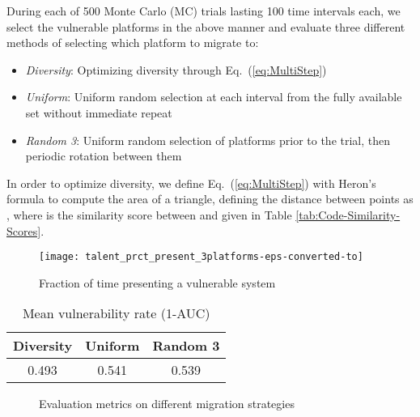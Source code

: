 \documentclass{acm_proc_article-sp}
\providecommand{\tabularnewline}{\\}
\begin{document}
During each of 500 Monte Carlo (MC) trials lasting 100 time intervals each, we select the vulnerable platforms in the above manner and evaluate three different methods of selecting which platform to migrate to:
\begin{itemize}
\item \emph{Diversity}: Optimizing diversity through Eq.\ (\ref{eq:MultiStep})
\item \emph{Uniform}: Uniform random selection at each interval from the fully available set without immediate repeat
\item \emph{Random 3}: Uniform random selection of  platforms prior to the trial, then periodic rotation between them
\end{itemize}
In order to optimize diversity, we define Eq.\ (\ref{eq:MultiStep}) with Heron's formula to compute the area of a triangle, defining the distance between points as , where  is the similarity score between  and  given in Table \ref{tab:Code-Similarity-Scores}.

\begin{figure}
\begin{centering}
\texttt{[image: talent\_prct\_present\_3platforms-eps-converted-to]}
\par\end{centering}
\caption{Fraction of time presenting a vulnerable system\label{fig:Percentage-Vulnerable}}
\end{figure}

\begin{table}[t]
\begin{centering}
\begin{tabular}{|c|c|c|}
\hline 
Diversity & Uniform & Random 3\tabularnewline
\hline 
\hline 
0.493 & 0.541 & 0.539\tabularnewline
\hline 
\end{tabular}
\par\end{centering}
\caption{Mean vulnerability rate (1-AUC)\label{tab:Mean-vulnerability-rate}}
\end{table}

\begin{figure*}[t]
\centering
{}
\caption{Evaluation metrics on different migration strategies\label{fig:Evaluation-metrics-Sim}}
\end{figure*}
\end{document}
